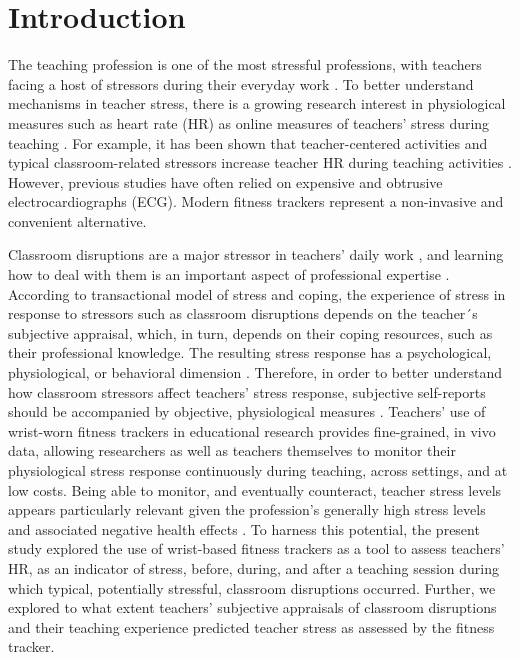 \documentclass[preprint, 3p,
authoryear]{elsarticle} %
\begin{document}
\section{Introduction}\label{introduction}

The teaching profession is one of the most stressful professions, with
teachers facing a host of stressors during their everyday work
\citep{smith2000, herman2020, schult2014belastet}. To better understand
mechanisms in teacher stress, there is a growing research interest in
physiological measures such as heart rate (HR) as online measures of
teachers' stress during teaching
\citep{karner2021teachers, wettstein2020ambulatory}. For example, it has
been shown that teacher-centered activities and typical
classroom-related stressors increase teacher HR during teaching
activities
\citep{sperka1995, scheuch1997psychophysische, donker2018, junker2021, huang2022class}.
However, previous studies have often relied on expensive and obtrusive
electrocardiographs (ECG). Modern fitness trackers represent a
non-invasive and convenient alternative. \citep{ferguson2015}

Classroom disruptions are a major stressor in teachers' daily work
\citep{boyle1995structural, aloe2014multivariate}, and learning how to
deal with them is an important aspect of professional expertise
\citep{wolff2015keeping}. According to \citet{lazarus1990theory}
transactional model of stress and coping, the experience of stress in
response to stressors such as classroom disruptions depends on the
teacher´s subjective appraisal, which, in turn, depends on their coping
resources, such as their professional knowledge. The resulting stress
response has a psychological, physiological, or behavioral dimension
\citep{kyriacou1978}. Therefore, in order to better understand how
classroom stressors affect teachers' stress response, subjective
self-reports should be accompanied by objective, physiological measures
\citep{wettstein2021}. Teachers' use of wrist-worn fitness trackers in
educational research provides fine-grained, in vivo data, allowing
researchers as well as teachers themselves to monitor their
physiological stress response continuously during teaching, across
settings, and at low costs. Being able to monitor, and eventually
counteract, teacher stress levels appears particularly relevant given
the profession's generally high stress levels and associated negative
health effects \citep{johnson2005experience, montgomery2005meta}. To
harness this potential, the present study explored the use of
wrist-based fitness trackers as a tool to assess teachers' HR, as an
indicator of stress, before, during, and after a teaching session during
which typical, potentially stressful, classroom disruptions occurred.
Further, we explored to what extent teachers' subjective appraisals of
classroom disruptions and their teaching experience predicted teacher
stress as assessed by the fitness tracker.
\end{document}

